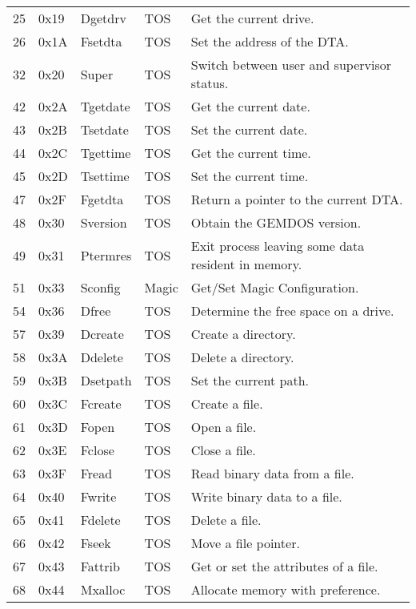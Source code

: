 \documentclass[a4paper]{article}
\begin{document}
\begin{supertabular}{|p{0.6cm}|p{1cm}|p{2cm}|p{1cm}|p{10cm}|}
25      & 0x19  & Dgetdrv     & TOS   & Get the current drive. \\
26      & 0x1A  & Fsetdta     & TOS   & Set the address of the DTA. \\
32      & 0x20  & Super       & TOS   & Switch between user and supervisor status. \\
42      & 0x2A  & Tgetdate    & TOS   & Get the current date. \\
43      & 0x2B  & Tsetdate    & TOS   & Set the current date. \\
44      & 0x2C  & Tgettime    & TOS   & Get the current time. \\
45      & 0x2D  & Tsettime    & TOS   & Set the current time. \\
47      & 0x2F  & Fgetdta     & TOS   & Return a pointer to the current DTA. \\
48      & 0x30  & Sversion    & TOS   & Obtain the GEMDOS version. \\
49      & 0x31  & Ptermres    & TOS   & Exit process leaving some data resident in memory. \\
51      & 0x33  & Sconfig     & Magic & Get$/$Set Magic Configuration. \\
54      & 0x36  & Dfree       & TOS   & Determine the free space on a drive. \\
57      & 0x39  & Dcreate     & TOS   & Create a directory. \\
58      & 0x3A  & Ddelete     & TOS   & Delete a directory. \\
59      & 0x3B  & Dsetpath    & TOS   & Set the current path. \\
60      & 0x3C  & Fcreate     & TOS   & Create a file. \\
61      & 0x3D  & Fopen       & TOS   & Open a file. \\
62      & 0x3E  & Fclose      & TOS   & Close a file. \\
63      & 0x3F  & Fread       & TOS   & Read binary data from a file. \\
64      & 0x40  & Fwrite      & TOS   & Write binary data to a file. \\
65      & 0x41  & Fdelete     & TOS   & Delete a file. \\
66      & 0x42  & Fseek       & TOS   & Move a file pointer. \\
67      & 0x43  & Fattrib     & TOS   & Get or set the attributes of a file. \\
68      & 0x44  & Mxalloc     & TOS   & Allocate memory with preference. \\

\end{supertabular}
\end{document}
